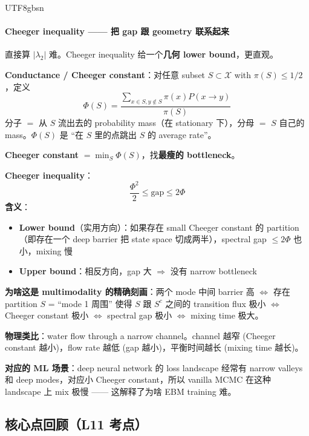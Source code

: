 \documentclass[11pt]{article}
\begin{document}
\begin{CJK}{UTF8}{gbsn}
\paragraph{Cheeger inequality —— 把 gap 跟 geometry 联系起来}

直接算 $|\lambda_2|$ 难。Cheeger inequality 给一个\textbf{几何 lower bound}，更直观。

\textbf{Conductance / Cheeger constant}：对任意 subset $S \subset \mathcal{X}$ with $\pi(S) \leq 1/2$，定义
\[
\Phi(S) = \frac{\sum_{x \in S, y \notin S} \pi(x) P(x \to y)}{\pi(S)}
\]
分子 $=$ 从 $S$ 流出去的 probability mass（在 stationary 下），分母 $=$ $S$ 自己的 mass。$\Phi(S)$ 是 ``在 $S$ 里的点跳出 $S$ 的 average rate''。

\textbf{Cheeger constant} $= \min_S \Phi(S)$，找\textbf{最瘦的 bottleneck}。

\textbf{Cheeger inequality}：
\[
\boxed{\frac{\Phi^2}{2} \leq \text{gap} \leq 2 \Phi}
\]
\textbf{含义}：
\begin{itemize}[nosep]
  \item \textbf{Lower bound}（实用方向）：如果存在 small Cheeger constant 的 partition（即存在一个 deep barrier 把 state space 切成两半），spectral gap $\leq 2\Phi$ 也小，mixing 慢
  \item \textbf{Upper bound}：相反方向，gap 大 $\Rightarrow$ 没有 narrow bottleneck
\end{itemize}

\textbf{为啥这是 multimodality 的精确刻画}：两个 mode 中间 barrier 高 $\Leftrightarrow$ 存在 partition $S$ = ``mode 1 周围'' 使得 $S$ 跟 $S^c$ 之间的 transition flux 极小 $\Leftrightarrow$ Cheeger constant 极小 $\Leftrightarrow$ spectral gap 极小 $\Leftrightarrow$ mixing time 极大。

\textbf{物理类比}：water flow through a narrow channel。channel 越窄 (Cheeger constant 越小)，flow rate 越低 (gap 越小)，平衡时间越长 (mixing time 越长)。

\textbf{对应的 ML 场景}：deep neural network 的 loss landscape 经常有 narrow valleys 和 deep modes，对应小 Cheeger constant，所以 vanilla MCMC 在这种 landscape 上 mix 极慢 —— 这解释了为啥 EBM training 难。

\subsection{核心点回顾（L11 考点）}


\end{CJK}
\end{document}
